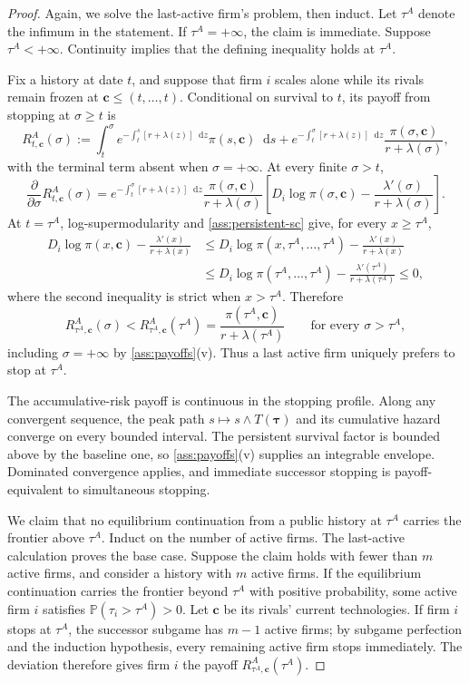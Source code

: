 \documentclass[12pt,reqno]{article}
\newcommand{\de}{\mathop{}\!\mathrm{d}}
\renewcommand{\Pr}{\mathbb{P}}
\theoremstyle{definition} \newtheorem{example}{Example}
\theoremstyle{definition} \newtheorem{condition}{Condition}
\theoremstyle{definition} \newtheorem{corollary}{Corollary}
\theoremstyle{definition} \newtheorem{claim}{Claim}
\theoremstyle{definition} \newtheorem{definition}{Definition}
\theoremstyle{definition} \newtheorem{conjecture}{Conjecture}
\theoremstyle{definition} \newtheorem{Lemma}{Lemma}
\theoremstyle{definition} \newtheorem{lemma}{Lemma}
\theoremstyle{plain} \newtheorem{theorem}{Theorem}
\theoremstyle{definition} \newtheorem{assumption}{Assumption}
\theoremstyle{definition} \newtheorem*{assumptionnonumber}{Assumption}
\theoremstyle{definition} \newtheorem*{theoremNoNumber}{Proposition}
\theoremstyle{definition}
\theoremstyle{definition}\newtheorem{proposition}{Proposition}
\theoremstyle{definition} \newtheorem{result}{Result}
\theoremstyle{definition} \newtheorem*{definitionNoNumber}{Definition}
\theoremstyle{definition} \newtheorem{Definition}{Definition}
\theoremstyle{definition} \newtheorem*{DefinitionNoNumber}{Definition}
\theoremstyle{definition} \newtheorem*{fact}{Fact}
\theoremstyle{definition} \newtheorem*{property}{Property}
\theoremstyle{definition} \newtheorem{remark}{Remark}
\begin{document}
\begin{proof}
Again, we solve the last-active firm's problem, then induct. Let $\tau^A$ denote the infimum in the statement. If $\tau^A=+\infty$, the claim is immediate. Suppose $\tau^A<+\infty$. Continuity implies that the defining
inequality holds at $\tau^A$.

Fix a history at date $t$, and suppose that firm $i$ scales alone while its
rivals remain frozen at $\bm c\leq(t,\ldots,t)$. Conditional on survival to
$t$, its payoff from stopping at $\sigma\geq t$ is
\[
R^A_{t,\bm c}(\sigma)
:=
\int_t^\sigma
e^{-\int_t^s[r+\lambda(z)]\de z}\pi(s,\bm c)\de s
+
e^{-\int_t^\sigma[r+\lambda(z)]\de z}
\frac{\pi(\sigma,\bm c)}{r+\lambda(\sigma)},
\]
with the terminal term absent when $\sigma=+\infty$. At every finite
$\sigma>t$,
\[
\frac{\partial}{\partial\sigma}R^A_{t,\bm c}(\sigma)
=
e^{-\int_t^\sigma[r+\lambda(z)]\de z}
\frac{\pi(\sigma,\bm c)}{r+\lambda(\sigma)}
\left[
D_i\log\pi(\sigma,\bm c)
-\frac{\lambda'(\sigma)}{r+\lambda(\sigma)}
\right].
\]
At $t=\tau^A$, log-supermodularity and
\cref{ass:persistent-sc} give, for every $x\geq\tau^A$,
\begin{align*}
D_i\log\pi(x,\bm c)-\frac{\lambda'(x)}{r+\lambda(x)}
&\leq
D_i\log\pi(x,\tau^A,\ldots,\tau^A)
-\frac{\lambda'(x)}{r+\lambda(x)}\\
&\leq
D_i\log\pi(\tau^A,\ldots,\tau^A)
-\frac{\lambda'(\tau^A)}{r+\lambda(\tau^A)}
\leq0,
\end{align*}
where the second inequality is strict when $x>\tau^A$. Therefore
\[
R^A_{\tau^A,\bm c}(\sigma)
<R^A_{\tau^A,\bm c}(\tau^A)
=\frac{\pi(\tau^A,\bm c)}{r+\lambda(\tau^A)}
\qquad\text{for every }\sigma>\tau^A,
\]
including $\sigma=+\infty$ by \cref{ass:payoffs}(v). Thus a last active firm
uniquely prefers to stop at $\tau^A$.

The accumulative-risk payoff is continuous in the stopping profile. Along any
convergent sequence, the peak path $s\mapsto s\wedge T(\bm\tau)$ and its
cumulative hazard converge on every bounded interval. The persistent survival
factor is bounded above by the baseline one, so \cref{ass:payoffs}(v) supplies
an integrable envelope. Dominated convergence applies, and immediate successor
stopping is payoff-equivalent to simultaneous stopping.

We claim that no equilibrium continuation from a public history at $\tau^A$
carries the frontier above $\tau^A$. Induct on the number of active firms. The
last-active calculation proves the base case. Suppose the claim holds with
fewer than $m$ active firms, and consider a history with $m$ active firms. If
the equilibrium continuation carries the frontier beyond $\tau^A$ with
positive probability, some active firm $i$ satisfies
$\Pr(\tau_i>\tau^A)>0$. Let $\bm c$ be its rivals' current technologies. If
firm $i$ stops at $\tau^A$, the successor subgame has $m-1$ active firms; by
subgame perfection and the induction hypothesis, every remaining active firm
stops immediately. The deviation therefore gives firm $i$ the payoff
$R^A_{\tau^A,\bm c}(\tau^A)$.


\end{proof}
\end{document}
